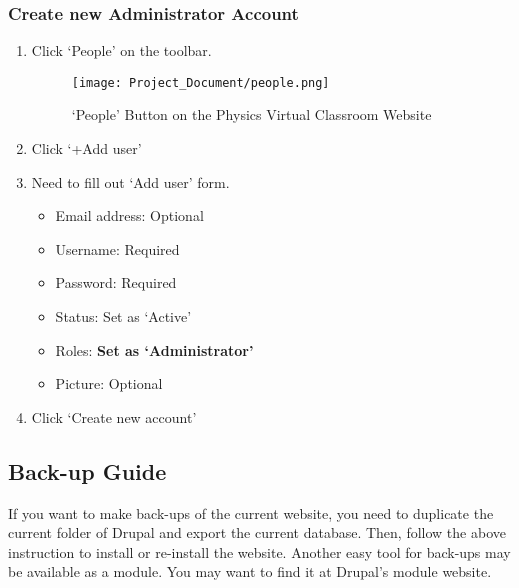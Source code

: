\documentclass[10pt]{article}
\begin{document}
        \subsubsection{Create new Administrator Account}
            \begin{enumerate}
                \item Click `People’ on the toolbar.
                    \begin{figure}[!ht]
            	        \centering
                        \texttt{[image: Project\_Document/people.png]}
                        \caption{`People' Button on the Physics Virtual Classroom Website}
                    \end{figure}
                \item Click `+Add user'
                \item Need to fill out `Add user' form.
                    \begin{itemize}
                        \item Email address: Optional
                        \item Username: Required
                        \item Password: Required
                        \item Status: Set as  `Active’
                        \item Roles: \textbf{Set as `Administrator'}
                        \item Picture: Optional
                    \end{itemize}
                \item Click `Create new account’
            \end{enumerate}

    \subsection{Back-up Guide}
        If you want to make back-ups of the current website, you need to duplicate the current folder of Drupal and export the current database. Then, follow the above instruction to install or re-install the website. Another easy tool for back-ups may be available as a module. You may want to find it at Drupal's module website.
\end{document}
